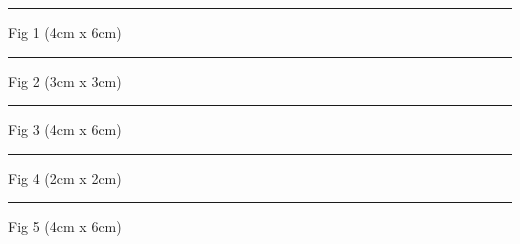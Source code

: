\documentclass[a4paper,11pt]{article}
\begin{document}
\begin{swarmwrap}%
  \begin{minipage}[t]{4cm}\centering\rule{\linewidth}{6cm}{\footnotesize Fig 1 (4cm x 6cm)}\end{minipage}%
\end{swarmwrap}%
\swarmwrapnext
\lipsum[1-5]%
\begin{swarmwrap}%
  \begin{minipage}[t]{3cm}\centering\rule{\linewidth}{3cm}{\footnotesize Fig 2 (3cm x 3cm)}\end{minipage}%
\end{swarmwrap}%
\swarmwrapnext
\lipsum[6-8]%
\begin{swarmwrap}%
  \begin{minipage}[t]{4cm}\centering\rule{\linewidth}{6cm}{\footnotesize Fig 3 (4cm x 6cm)}\end{minipage}%
\end{swarmwrap}%
\swarmwrapnext
\lipsum[9-13]%
\begin{swarmwrap}%
  \begin{minipage}[t]{2cm}\centering\rule{\linewidth}{2cm}{\footnotesize Fig 4 (2cm x 2cm)}\end{minipage}%
\end{swarmwrap}%
\swarmwrapnext
\lipsum[14-16]%
\begin{swarmwrap}%
  \begin{minipage}[t]{4cm}\centering\rule{\linewidth}{6cm}{\footnotesize Fig 5 (4cm x 6cm)}\end{minipage}%
\end{swarmwrap}%
\swarmwrapnext
\lipsum[17-21]%
\end{document}
